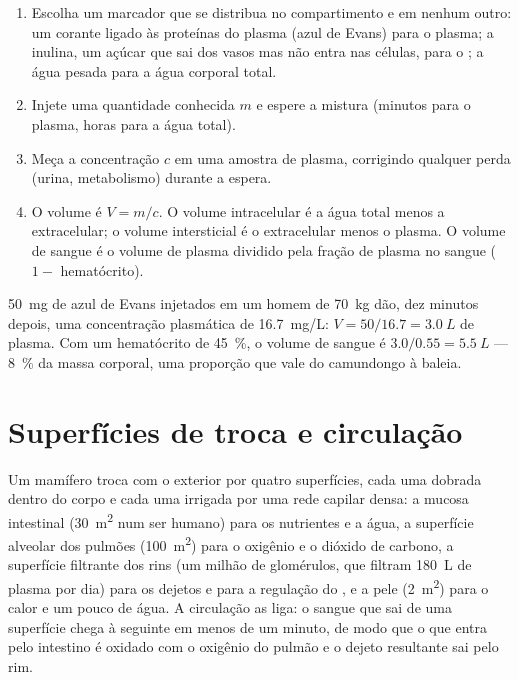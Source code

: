 \begin{method}\label{met:b1:mammal-organization:dilution}
\begin{enumerate}
  \item Escolha um marcador que se distribua no compartimento e em
        nenhum outro: um corante ligado às proteínas do plasma (azul de
        Evans) para o plasma; a inulina, um açúcar que sai dos vasos mas
        não entra nas células, para o ; a água
        pesada para a água corporal total.
  \item Injete uma quantidade conhecida $m$ e espere a mistura (minutos
        para o plasma, horas para a água total).
  \item Meça a concentração $c$ em uma amostra de plasma, corrigindo
        qualquer perda (urina, metabolismo) durante a espera.
  \item O volume é $V = m/c$. O volume intracelular é a água total menos
        a extracelular; o volume intersticial é o extracelular menos o
        plasma. O volume de sangue é o volume de plasma dividido pela
        fração de plasma no sangue ($1 - $ hematócrito).
\end{enumerate}
\end{method}

\begin{example}\label{ex:b1:mammal-organization:evansblue}
\qty{50}{mg} de azul de Evans injetados em um homem de \qty{70}{kg} dão,
dez minutos depois, uma concentração plasmática de \qty{16.7}{mg/L}:
$V = 50/16.7 = \qty{3.0}{L}$ de plasma. Com um hematócrito de
\qty{45}{\%}, o volume de sangue é $3.0/0.55 = \qty{5.5}{L}$ ---
\qty{8}{\%} da massa corporal, uma proporção que vale do camundongo à
baleia.
\end{example}

\section{Superfícies de troca e circulação}

\begin{proposition}\label{prop:b1:mammal-organization:surfaces}
Um mamífero troca com o exterior por quatro superfícies, cada uma
dobrada dentro do corpo e cada uma irrigada por uma rede capilar densa:
a mucosa intestinal (\qty{30}{m^2} num ser humano) para os nutrientes e
a água, a superfície alveolar dos pulmões (\qty{100}{m^2}) para o
oxigênio e o dióxido de carbono, a superfície filtrante dos rins (um
milhão de glomérulos, que filtram \qty{180}{L} de plasma por dia) para
os dejetos e para a regulação do , e a pele (\qty{2}{m^2})
para o calor e um pouco de água. A circulação as liga: o sangue que sai
de uma superfície chega à seguinte em menos de um minuto, de modo que o
que entra pelo intestino é oxidado com o oxigênio do pulmão e o dejeto
resultante sai pelo rim.
\end{proposition}

